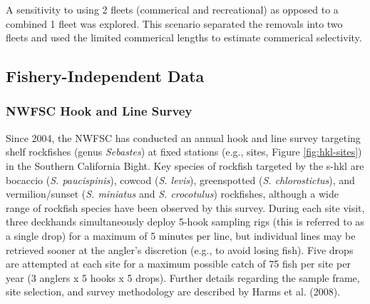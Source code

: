 \documentclass[11pt,
  english,
  a4paper,
]{article}
\begin{document}
A sensitivity to using 2 fleets (commerical and recreational) as opposed to a combined 1 fleet was explored. This scenario separated the removals into two fleets and used the limited commerical lengths to estimate commerical selectivity.

\leavevmode\tagmcend\tagstructend\par


\hypertarget{fishery-independent-data}{%
\subsection{Fishery-Independent Data}\label{fishery-independent-data}}

\leavevmode\tagmcend\tagstructend


\hypertarget{nwfsc-hook-and-line-survey}{%
\subsubsection{NWFSC Hook and Line Survey}\label{nwfsc-hook-and-line-survey}}

\leavevmode\tagmcend\tagstructend


Since 2004, the NWFSC has conducted an annual hook and line survey targeting shelf rockfishes (genus \emph{Sebastes}) at fixed stations (e.g., sites, Figure \ref{fig:hkl-sites}) in the Southern California Bight. Key species of rockfish targeted by the \gls{s-hkl} are bocaccio (\emph{S. paucispinis}), cowcod (\emph{S. levis}), greenspotted (\emph{S. chlorostictus}), and vermilion/sunset (\emph{S. miniatus} and \emph{S. crocotulus}) rockfishes, although a wide range of rockfish species have been observed by this survey. During each site visit, three deckhands simultaneously deploy 5-hook sampling rigs (this is referred to as a single drop) for a maximum of 5 minutes per line, but individual lines may be retrieved sooner at the angler's discretion (e.g., to avoid losing fish). Five drops are attempted at each site for a maximum possible catch of 75 fish per site per year (3 anglers x 5 hooks x 5 drops). Further details regarding the sample frame, site selection, and survey methodology are described by Harms et al. {(2008)\leavevmode\tagmcend\tagstructend}.
\end{document}
